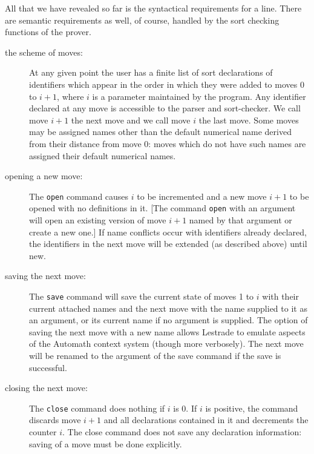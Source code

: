 \documentclass[12pt]{article}
\begin{document}
All that we have revealed so far is the syntactical requirements for a line.   There are semantic requirements as well, of course, handled by the sort checking functions of the prover.

\begin{description}

\item[the scheme of moves:]  At any given point the user has a finite list of sort declarations of identifiers which appear in the order in which they were added to moves 0 to $i+1$, where $i$ is a parameter maintained by the program.   Any identifier declared at any move is accessible to the parser and sort-checker.  We call move $i+1$ the next move and we call move $i$ the last move.  Some moves may be assigned names other than the default numerical name derived from their distance from move 0:  moves which do not have such names are assigned their default numerical names.

\item[opening a new move:]  The {\tt open} command causes $i$ to be incremented and a new move $i+1$ to be opened with no definitions in it.  [The command
{\tt open} with an argument will open an existing version of move $i+1$ named by that argument or create a new one.]   If name conflicts occur with identifiers already declared,
the identifiers in the next move will be extended (as described above) until new.

\item[saving the next move:]  The {\tt save} command will save the current state of moves 1 to $i$ with their current attached names and the next move
with the name supplied to it as an argument, or its current name if no argument is supplied.
  The option of saving the next move with a new name allows Lestrade to emulate aspects of
the Automath context system (though more verbosely).  The next move will be renamed to the argument of the save command if the save is successful.

\item[closing the next move:]  The {\tt close} command does nothing if $i$ is 0.  If $i$ is positive, the command discards move $i+1$ and all declarations contained in it and decrements the counter $i$.  The close command does not save any declaration information:  saving of a move must be done explicitly.


\end{description}
\end{document}
